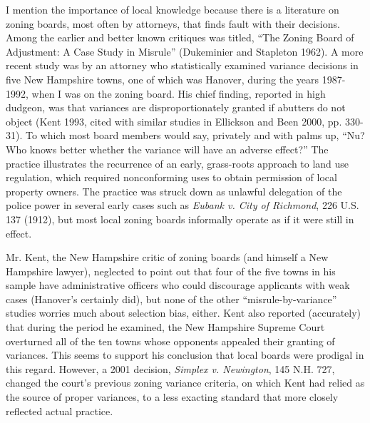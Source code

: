 I mention the importance of local knowledge because there is a literature on
zoning boards, most often by attorneys, that finds fault with their decisions.
Among the earlier and better known critiques was titled, ``The Zoning Board of
Adjustment: A Case Study in Misrule'' (Dukeminier and Stapleton 1962). A more
recent study was by an attorney who statistically examined variance decisions in
five New Hampshire towns, one of which was Hanover, during the years 1987-1992,
when I was on the zoning board. His chief finding, reported in high dudgeon, was
that variances are disproportionately granted if abutters do not object (Kent
1993, cited with similar studies in Ellickson and Been 2000, pp. 330-31). To
which most board members would say, privately and with palms up, ``Nu? Who knows
better whether the variance will have an adverse effect?'' The practice
illustrates the recurrence of an early, grass-roots approach to land use
regulation, which required nonconforming uses to obtain permission of local
property owners. The practice was struck down as unlawful delegation of the
police power in several early cases such as \emph{Eubank v. City of Richmond},
226 U.S. 137 (1912), but most local zoning boards informally operate as if it
were still in effect.

Mr. Kent, the New Hampshire critic of zoning boards (and himself a New Hampshire
lawyer), neglected to point out that four of the five towns in his sample have
administrative officers who could discourage applicants with weak cases
(Hanover's certainly did), but none of the other ``misrule-by-variance'' studies
worries much about selection bias, either. Kent also reported (accurately) that
during the period he examined, the New Hampshire Supreme Court overturned all of
the ten towns whose opponents appealed their granting of variances. This seems
to support his conclusion that local boards were prodigal in this regard.
However, a 2001 decision, \emph{Simplex v. Newington}, 145 N.H. 727, changed the
court's previous zoning variance criteria, on which Kent had relied as the
source of proper variances, to a less exacting standard that more closely
reflected actual practice.

